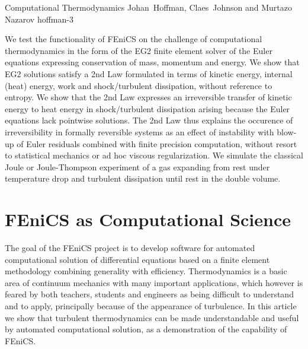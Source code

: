               {Computational Thermodynamics}
              {Johan~Hoffman, Claes~Johnson and Murtazo Nazarov}
              {hoffman-3}
	      

\newcommand{\bbR}{{\Bbb{R}}}
\newcommand{\bbC}{{\Bbb{C}}}

We test the functionality of FEniCS on the challenge of computational
thermodynamics in the form 
of the EG2 finite element solver of the Euler equations expressing conservation 
of mass, momentum and energy. We show that EG2 solutions satisfy a 2nd
Law formulated 
in terms of kinetic energy,  internal (heat) energy, work and shock/turbulent
dissipation, 
without reference to entropy. We show that the 2nd Law 
expresses an irreversible transfer of kinetic energy to heat energy in
shock/turbulent dissipation 
arising because the Euler equations lack pointwise solutions.
The 2nd Law thus explains the occurence of irreversibility in formally
reversible systems
as an effect of instability with blow-up of Euler residuals combined with finite
precision 
computation, without resort to statistical mechanics or ad hoc viscous
regularization. 
We simulate the classical Joule or Joule-Thompson experiment
of a gas expanding from rest under temperature drop and turbulent dissipation 
until rest in the double volume. 

\section{FEniCS as Computational Science}

The goal of the FEniCS project is to develop software for automated
computational solution of differential equations based on 
a finite element methodology combining generality with efficiency. 
Thermodynamics is a basic area of continuum mechanics with many important
applications, which however is feared 
by both teachers, students and engineers as being difficult to understand and to
apply, principally because of the 
appearance of turbulence. In this article we show that turbulent thermodynamics
can be made understandable and useful by automated 
computational solution, as a demonstration of the capability of FEniCS. 

